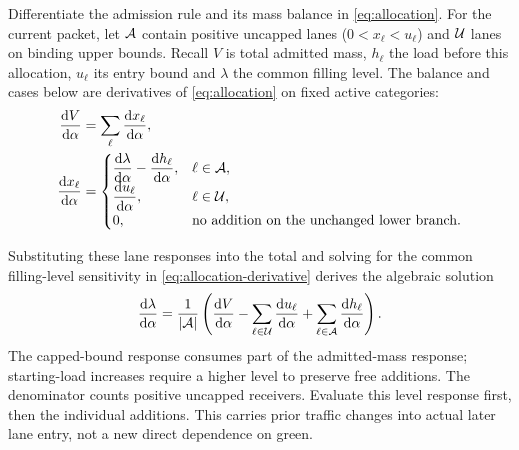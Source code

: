 \documentclass[10pt,a4paper]{article}
\begin{document}
\par\begin{samepage}
Differentiate the admission rule and its mass balance in
\eqref{eq:allocation}. For the current packet, let ${\cal A}$ contain
positive uncapped lanes ($0<x_\ell<u_\ell$) and ${\cal U}$ lanes on
binding upper bounds. Recall $V$ is total admitted mass, $h_\ell$ the
load before this allocation, $u_\ell$ its entry bound and $\lambda$
the common filling level.
The balance and cases below are derivatives of \eqref{eq:allocation} on fixed active categories:
\begin{equation}
 \begin{aligned}
 \frac{\mathrm dV}{\mathrm d\alpha}
 &=\sum_\ell\frac{\mathrm dx_\ell}{\mathrm d\alpha},\\
 \frac{\mathrm dx_\ell}{\mathrm d\alpha}
 &=\begin{cases}
 \displaystyle\frac{\mathrm d\lambda}{\mathrm d\alpha}
             -\frac{\mathrm dh_\ell}{\mathrm d\alpha},&\ell\in{\cal A},\\
 \displaystyle\frac{\mathrm du_\ell}{\mathrm d\alpha},&\ell\in{\cal U},\\
 0,&\text{no addition on the unchanged lower branch}.
 \end{cases}
 \end{aligned}
 \label{eq:allocation-derivative}
\end{equation}
\par\end{samepage}
Substituting these lane responses into the total and solving for the
common filling-level sensitivity in \eqref{eq:allocation-derivative} derives the algebraic solution
\begin{equation}
 \frac{\mathrm d\lambda}{\mathrm d\alpha}
 =\frac1{|{\cal A}|}\left(
 \frac{\mathrm dV}{\mathrm d\alpha}
 -\sum_{\ell\in{\cal U}}\frac{\mathrm du_\ell}{\mathrm d\alpha}
 +\sum_{\ell\in{\cal A}}\frac{\mathrm dh_\ell}{\mathrm d\alpha}\right).
 \label{eq:allocation-level-derivative}
\end{equation}
The capped-bound response consumes part of the admitted-mass response;
starting-load increases require a higher level to preserve free additions.
The denominator counts positive uncapped receivers. Evaluate this level
response first, then the individual additions. This carries prior traffic
changes into actual later lane entry, not a new direct dependence on green.
\end{document}
